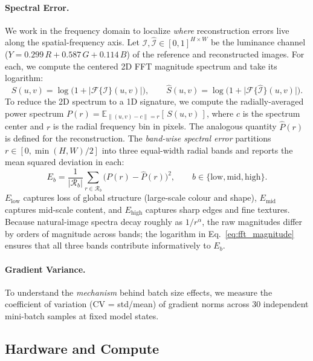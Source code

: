 \documentclass[a4paper,oneside,11pt,english]{scrartcl}
\begin{document}
\paragraph{Spectral Error.}
We work in the frequency domain to localize \emph{where} reconstruction
errors live along the spatial-frequency axis.  Let $\mathcal{I},
\hat{\mathcal{I}} \in [0,1]^{H \times W}$ be the luminance channel
($Y = 0.299\,R + 0.587\,G + 0.114\,B$) of the reference and reconstructed
images.  For each, we compute the centered 2D FFT magnitude spectrum and
take its logarithm:
\begin{equation}
    S(u,v) = \log\bigl(1 + \bigl|\mathcal{F}\{\mathcal{I}\}(u,v)\bigr|\bigr),
    \qquad \hat{S}(u,v) = \log\bigl(1 + \bigl|\mathcal{F}\{\hat{\mathcal{I}}\}(u,v)\bigr|\bigr).
    \label{eq:fft_magnitude}
\end{equation}
To reduce the 2D spectrum to a 1D signature, we compute the radially-averaged
power spectrum $P(r) = \mathbb{E}_{\|(u,v) - c\| = r}[\,S(u,v)\,]$, where $c$ is
the spectrum center and $r$ is the radial frequency bin in pixels.  The
analogous quantity $\hat{P}(r)$ is defined for the reconstruction.  The
\emph{band-wise spectral error} partitions $r \in [0, \min(H,W)/2]$ into three
equal-width radial bands and reports the mean squared deviation in each:
\begin{equation}
    E_b = \frac{1}{|\mathcal{R}_b|}\sum_{r \in \mathcal{R}_b}
          \bigl(P(r) - \hat{P}(r)\bigr)^2,
    \qquad b \in \{\text{low}, \text{mid}, \text{high}\}.
    \label{eq:spectral_error}
\end{equation}
$E_{\text{low}}$ captures loss of global structure (large-scale colour and
shape), $E_{\text{mid}}$ captures mid-scale content, and $E_{\text{high}}$
captures sharp edges and fine textures.  Because natural-image spectra decay
roughly as $1/r^\alpha$, the raw magnitudes differ by orders of magnitude
across bands; the logarithm in Eq.~\ref{eq:fft_magnitude} ensures that all
three bands contribute informatively to $E_b$.

\paragraph{Gradient Variance.}
To understand the \emph{mechanism} behind batch size effects, we measure the
coefficient of variation (CV = std/mean) of gradient norms across 30
independent mini-batch samples at fixed model states.

\subsection{Hardware and Compute}
\end{document}
